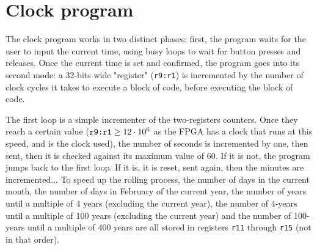 \documentclass{scrartcl}
\begin{document}
\section*{Clock program}

The clock program works in two distinct phases: first, the program waits for
the user to input the current time, using busy loops to wait for button
presses and releases. Once the current time is set and confirmed, the program
goes into its second mode: a 32-bits wide "register" (\verb+r9:r1+) is
incremented by the number of clock cycles it takes to execute a block of
code, before executing the block of code.\par
The first loop is a simple incrementer of the two-registers counters. Once
they reach a certain value ($\verb+r9:r1+ \geq 12 \cdot 10^6$ as the FPGA has
a clock that runs at this speed, and is the clock used), the number of
seconds is incremented by one, then sent, then it is checked against its
maximum value of $60$. If it is not, the program jumps back to the first
loop. If it is, it is reset, sent again, then the minutes are
incremented...
To speed up the rolling process, the number of days in the current month, the
number of days in February of the current year, the number of years until a
multiple of 4 years (excluding the current year), the number of 4-years until
a multiple of 100 years (excluding the current year) and the number of
100-years until a multiple of 400 years are all stored in registers
\verb+r11+ through \verb+r15+ (not in that order).
\end{document}
